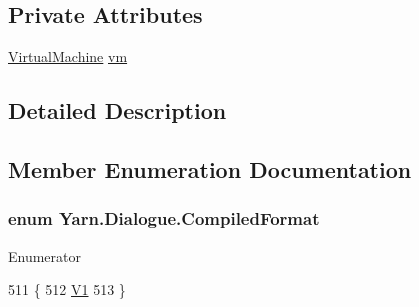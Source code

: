 \subsection*{Private Attributes}
\begin{DoxyCompactItemize}
\item 
\hyperlink{a00136}{Virtual\-Machine} \hyperlink{a00070_a8c1319357a9df6cff051328fb33224c7}{vm}
\end{DoxyCompactItemize}


\subsection{Detailed Description}


\subsection{Member Enumeration Documentation}
\hypertarget{a00070_a903f18cdcc66c28ceab5a43c41fe074d}{
\subsubsection[{Compiled\-Format}]{\setlength{\rightskip}{0pt plus 5cm}enum {\bf Yarn.\-Dialogue.\-Compiled\-Format}}}\label{a00070_a903f18cdcc66c28ceab5a43c41fe074d}
\begin{Desc}
\item[Enumerator]\par
\begin{description}
\item[{\em 
\hypertarget{a00070_a903f18cdcc66c28ceab5a43c41fe074dab4daca084ad9eabfc8de231929477ed6}{V1}\label{a00070_a903f18cdcc66c28ceab5a43c41fe074dab4daca084ad9eabfc8de231929477ed6}
}]\end{description}
\end{Desc}

\begin{DoxyCode}
511         \{
512             \hyperlink{a00070_a903f18cdcc66c28ceab5a43c41fe074dab4daca084ad9eabfc8de231929477ed6}{V1}
513         \}
\end{DoxyCode}


